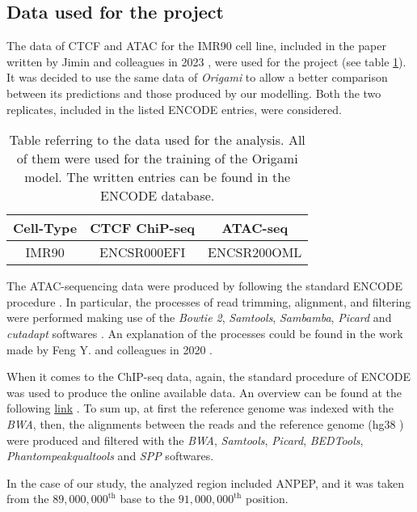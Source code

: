 \subsection{Data used for the project} \label{methods: data used}
The data of CTCF and ATAC for the IMR90 cell line, included in the paper written by Jimin and colleagues in 2023
\cite{tanCelltypespecificPrediction3D2023},
were used for the project (see table \ref{tab:data}). It was decided to use the same data of \textit{Origami} to allow a better comparison between its predictions and those produced by our modelling. Both the two replicates, included in the listed ENCODE entries, were considered.

\begin{table}[H]
    \centering
    \begin{tabular}{|c|c|c|}
        \hline
        \textbf{Cell-Type} & \textbf{CTCF ChiP-seq} & \textbf{ATAC-seq}\\
        \hline
        IMR90 & ENCSR000EFI & ENCSR200OML\\
        \hline
    \end{tabular}
    \caption{Table referring to the data used for the analysis. All of them were used for the training of the Origami\cite{tanCelltypespecificPrediction3D2023} model. The written entries can be found in the ENCODE database\cite{encodeprojectconsortiumIntegratedEncyclopediaDNA2012}.}
    \label{tab:data}
\end{table}

The ATAC-sequencing data were produced by following the standard ENCODE procedure
\cite{ATACseqUnreplicatedENCODE}. 
In particular, the processes of read trimming, alignment, and filtering were performed making use of the \textit{Bowtie 2}, \textit{Samtools}, \textit{Sambamba}, \textit{Picard} and \textit{cutadapt} softwares
\cite{michaelcherryATACSeqPipeline}. 
An explanation of the processes could be found in the work made by Feng Y. and colleagues in 2020
\cite{yanReadsInsightHitchhiker2020}.

When it comes to the ChIP-seq data, again, the standard procedure of ENCODE was used to produce the online available data. An overview can be found at the following \href{https://www.encodeproject.org/chip-seq/transcription_factor/}{link}
\cite{TranscriptionFactorChIPseq}.
To sum up, at first the reference genome was indexed with the \textit{BWA}, then, the alignments between the reads and the reference genome (hg38
\cite{HomoSapiensGenome})
were produced and filtered with the \textit{BWA}, \textit{Samtools}, \textit{Picard}, \textit{BEDTools}, \textit{Phantompeakqualtools} and \textit{SPP} softwares.


In the case of our study, the analyzed region included ANPEP, and it was taken from the $89,000,000^{\text{th}}$ base to the $91,000,000^{\text{th}}$ position.
